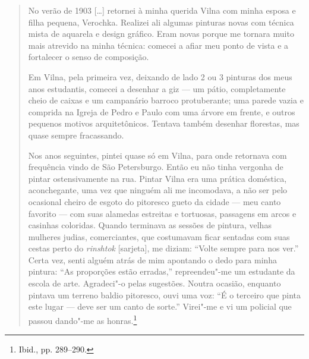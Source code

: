 \begin{quote}
No verão de 1903 [\ldots{}] retornei à minha querida Vilna com minha
esposa e filha pequena, Verochka. Realizei ali algumas pinturas novas
com técnica mista de aquarela e design gráfico. Eram novas porque me
tornara muito mais atrevido na minha técnica: comecei a afiar meu ponto
de vista e a fortalecer o senso de composição.

Em Vilna, pela primeira vez, deixando de lado 2 ou 3 pinturas dos meus
anos estudantis, comecei a desenhar a giz --- um pátio, completamente
cheio de caixas e um campanário barroco protuberante; uma parede vazia e
comprida na Igreja de Pedro e Paulo com uma árvore em frente, e outros
pequenos motivos arquitetônicos. Tentava também desenhar florestas, mas
quase sempre fracassando.

Nos anos seguintes, pintei quase só em Vilna, para onde retornava com
frequência vindo de São Petersburgo. Então eu não tinha vergonha de
pintar ostensivamente na rua. Pintar Vilna era uma prática doméstica,
aconchegante, uma vez que ninguém ali me incomodava, a não ser pelo
ocasional cheiro de esgoto do pitoresco gueto da cidade --- meu canto
favorito --- com suas alamedas estreitas e tortuosas, passagens em arcos e
casinhas coloridas. Quando terminava as sessões de pintura, velhas
mulheres judias, comerciantes, que costumavam ficar sentadas com suas
cestas perto do \textit{rinshtok} {[}sarjeta{]}, me diziam: ``Volte sempre
para nos ver.'' Certa vez, senti alguém atrás de mim apontando o dedo
para minha pintura: ``As proporções estão erradas,'' repreendeu"-me um
estudante da escola de arte. Agradeci"-o pelas sugestões. Noutra ocasião,
enquanto pintava um terreno baldio pitoresco, ouvi uma voz: ``É o
terceiro que pinta este lugar --- deve ser um canto de sorte.'' Virei"-me e
vi um policial que passou dando"-me as honras.\footnote{Ibid., pp. 289--290.} 
\end{quote}

